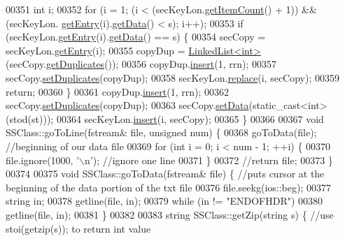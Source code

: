 \begin{DoxyCode}
00351         \textcolor{keywordtype}{int} i;
00352     \textcolor{keywordflow}{for} (i = 1; (i < (secKeyLon.\hyperlink{classLinkedList_afc6635f854f48f2f126cf3b60d845220}{getItemCount}() + 1)) && (secKeyLon.
      \hyperlink{classLinkedList_a341bfd7772c9d24d29eb7a7f3936915b}{getEntry}(i).\hyperlink{classSecKeySS_a9fdb8a771250b7aaab556f019b381eab}{getData}() < s); i++);
00353     \textcolor{keywordflow}{if} (secKeyLon.\hyperlink{classLinkedList_a341bfd7772c9d24d29eb7a7f3936915b}{getEntry}(i).\hyperlink{classSecKeySS_a9fdb8a771250b7aaab556f019b381eab}{getData}() == s) \{
00354         secCopy = secKeyLon.\hyperlink{classLinkedList_a341bfd7772c9d24d29eb7a7f3936915b}{getEntry}(i);
00355         copyDup = \hyperlink{classLinkedList}{LinkedList<int>}(secCopy.\hyperlink{classSecKeySS_abef7c9c03e9bc6b818d599966428fdec}{getDuplicates}());
00356         copyDup.\hyperlink{classLinkedList_ae8a19375505e87e2e4fc0e9b5afe4d4d}{insert}(1, rrn);
00357         secCopy.\hyperlink{classSecKeySS_a95fdde8fc0b590359692784d15481dd4}{setDuplicates}(copyDup);
00358         secKeyLon.\hyperlink{classLinkedList_a3035f880c50e7d8f68e67c093d4607ca}{replace}(i, secCopy);
00359         \textcolor{keywordflow}{return};
00360     \}
00361     copyDup.\hyperlink{classLinkedList_ae8a19375505e87e2e4fc0e9b5afe4d4d}{insert}(1, rrn);
00362     secCopy.\hyperlink{classSecKeySS_a95fdde8fc0b590359692784d15481dd4}{setDuplicates}(copyDup);
00363     secCopy.\hyperlink{classSecKeySS_ae893fbaf619bf61f73f1585ae5686609}{setData}(static\_cast<int>(stod(st)));
00364     secKeyLon.\hyperlink{classLinkedList_ae8a19375505e87e2e4fc0e9b5afe4d4d}{insert}(i, secCopy);
00365 \}
00366 
00367 \textcolor{keywordtype}{void} SSClass::goToLine(fstream& file, \textcolor{keywordtype}{unsigned} num) \{
00368     goToData(file); \textcolor{comment}{//beginning of our data file}
00369     \textcolor{keywordflow}{for} (\textcolor{keywordtype}{int} i = 0; i < num - 1; ++i) \{
00370         file.ignore(1000, \textcolor{charliteral}{'\(\backslash\)n'}); \textcolor{comment}{//ignore one line}
00371     \}
00372     \textcolor{comment}{//return file;}
00373 \}
00374 
00375 \textcolor{keywordtype}{void} SSClass::goToData(fstream& file) \{ \textcolor{comment}{//puts cursor at the beginning of the data portion of the txt file}
00376     file.seekg(ios::beg);
00377     \textcolor{keywordtype}{string} in;
00378     getline(file, in);
00379     \textcolor{keywordflow}{while} (in != \textcolor{stringliteral}{"ENDOFHDR"})
00380         getline(file, in);
00381 \}
00382 
00383 \textcolor{keywordtype}{string} SSClass::getZip(\textcolor{keywordtype}{string} s) \{ \textcolor{comment}{//use stoi(getzip(s)); to return int value}

\end{DoxyCode}
